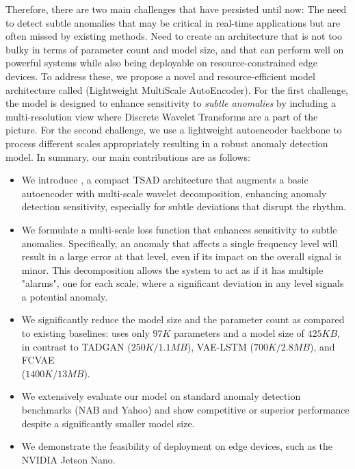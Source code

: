 Therefore, there are two main challenges that have persisted until now: \one The need to detect subtle anomalies that may be critical in real-time applications but are often missed by existing methods. \two Need to create an architecture that is not too bulky in terms of parameter count and model size, and that can perform well on powerful systems while also being deployable on resource-constrained edge devices. To address these, we propose a novel and resource-efficient model architecture called \textbf{\fname{}} (Lightweight MultiScale AutoEncoder). For the first challenge, the model is  designed to enhance sensitivity to \emph{subtle anomalies} by including a multi-resolution view where Discrete Wavelet Transforms are a part of the picture. For the second challenge, we use a lightweight autoencoder backbone to process different scales appropriately resulting in a robust anomaly detection model. In summary, our main contributions are as follows:

\begin{itemize}
    \item We introduce \fname{}, a compact TSAD architecture that augments a basic autoencoder with multi-scale wavelet decomposition, enhancing anomaly detection sensitivity, especially for subtle 
    deviations that disrupt the rhythm.
    \item We formulate a multi-scale loss function that enhances sensitivity to subtle anomalies. Specifically, an anomaly that affects a single  frequency level will result in a large error at that level, even if its impact on the overall signal is minor. This decomposition allows the system to act as if it has multiple "alarms", one for each scale, where a significant deviation in any level signals a potential anomaly.
    \item We significantly reduce the model size and the parameter count as compared to existing baselines: \fname{} uses only $97K$ parameters and a model size of $425 KB$, in contrast to TADGAN ($250K/1.1MB$), VAE-LSTM ($700K/2.8MB$), and FCVAE  \\
    ($1400K/13MB$).
    \item We extensively evaluate our model on standard anomaly detection benchmarks (NAB and Yahoo) and show
    competitive or superior performance despite a significantly smaller model size. 
    \item We demonstrate the feasibility of deployment on edge devices, such as the NVIDIA Jetson Nano. 
\end{itemize}

